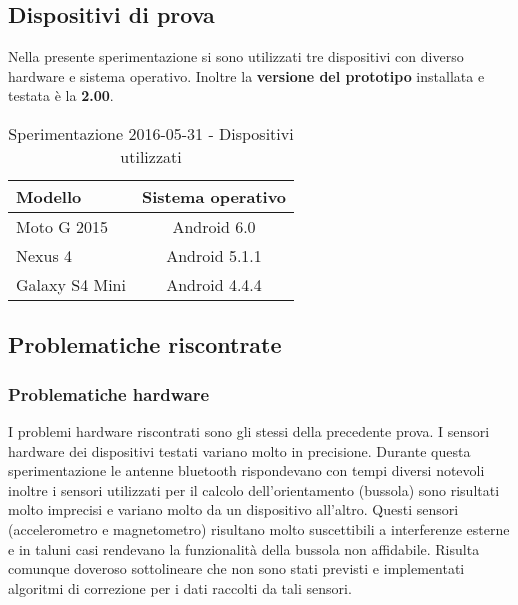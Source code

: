 \documentclass[../Sperimentazione.tex]{subfiles}
\begin{document}
		\subsection{Dispositivi di prova}
			Nella presente sperimentazione si sono utilizzati tre dispositivi con diverso hardware e sistema operativo. Inoltre la \textbf{versione del prototipo} installata e testata è la \textbf{2.00}.
	
			\begin{table} [h]
			\centering
				\begin{tabular}{lc}
					\textbf{Modello} & \textbf{Sistema operativo} \\
					\toprule
					 Moto G 2015 & Android 6.0 \\
					 \midrule
					 Nexus 4 & Android 5.1.1 \\
					 \midrule
					 Galaxy S4 Mini & Android 4.4.4 \\
					\bottomrule
				\end{tabular}
				\caption{Sperimentazione 2016-05-31 - Dispositivi utilizzati}
				\label{tab:Sperimentazione1Dispositivi}
			\end{table}
		
			
		\newpage
			
	
		\newpage
		\subsection{Problematiche riscontrate}
		
			\subsubsection{Problematiche hardware}
				I problemi hardware riscontrati sono gli stessi della precedente prova. I sensori hardware dei dispositivi testati variano molto in precisione. Durante questa sperimentazione le antenne bluetooth rispondevano con tempi diversi notevoli inoltre i sensori utilizzati per il calcolo dell'orientamento (bussola) sono risultati molto imprecisi e variano molto da un dispositivo all'altro. Questi sensori (accelerometro e magnetometro) risultano molto suscettibili a interferenze esterne e in taluni casi rendevano la funzionalità della bussola non affidabile. Risulta comunque doveroso sottolineare che non sono stati previsti e implementati algoritmi di correzione per i dati raccolti da tali sensori.
		
\end{document}
